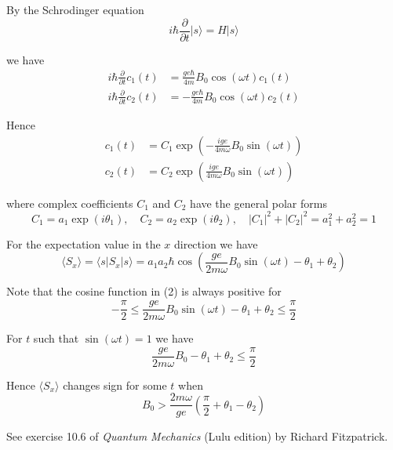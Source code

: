By the Schrodinger equation
\begin{equation*}
i\hbar\frac{\partial}{\partial t}|s\rangle=H|s\rangle
\end{equation*}

we have
\begin{align*}
i\hbar\frac{\partial}{\partial t}c_1(t)&=\frac{ge\hbar}{4m}B_0\cos(\omega t)c_1(t)
\\
i\hbar\frac{\partial}{\partial t}c_2(t)&=-\frac{ge\hbar}{4m}B_0\cos(\omega t)c_2(t)
\end{align*}

Hence
\begin{equation*}
\begin{aligned}
c_1(t)&=C_1\exp\left(-\frac{ige}{4m\omega}B_0\sin(\omega t)\right)
\\
c_2(t)&=C_2\exp\left(\frac{ige}{4m\omega}B_0\sin(\omega t)\right)
\end{aligned}
\tag{1}
\end{equation*}

where complex coefficients $C_1$ and $C_2$ have the general polar forms
\begin{equation*}
C_1=a_1\exp(i\theta_1),\quad C_2=a_2\exp(i\theta_2),\quad|C_1|^2+|C_2|^2=a_1^2+a_2^2=1
\end{equation*}

For the expectation value in the $x$ direction we have
\begin{equation*}
\langle S_x\rangle=\langle s|S_x|s\rangle
=a_1a_2\hbar\cos\left(\frac{ge}{2m\omega}B_0\sin(\omega t)-\theta_1+\theta_2\right)
\tag{2}
\end{equation*}

Note that the cosine function in (2) is always positive for
\begin{equation*}
-\frac{\pi}{2}\le\frac{ge}{2m\omega}B_0\sin(\omega t)-\theta_1+\theta_2\le\frac{\pi}{2}
\end{equation*}

For $t$ such that $\sin(\omega t)=1$ we have
\begin{equation*}
\frac{ge}{2m\omega}B_0-\theta_1+\theta_2\le\frac{\pi}{2}
\end{equation*}

Hence $\langle S_x\rangle$ changes sign for some $t$ when
\begin{equation*}
B_0>\frac{2m\omega}{ge}\left(\frac{\pi}{2}+\theta_1-\theta_2\right)
\end{equation*}

See exercise 10.6 of {\it Quantum Mechanics}
(Lulu edition) by Richard Fitzpatrick.


